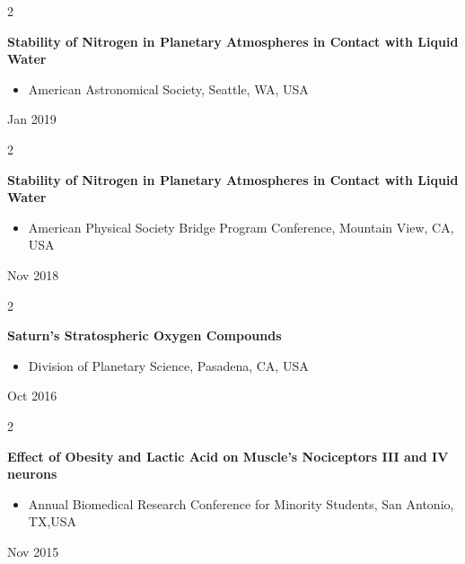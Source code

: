 \documentclass[10pt, letterpaper]{article}
\newenvironment{highlights}{
    \begin{itemize}[
        topsep=0.10 cm,
        parsep=0.10 cm,
        partopsep=0pt,
        itemsep=0pt,
        leftmargin=0.4 cm + 10pt
    ]
}{
    \end{itemize}
} %
\newenvironment{twocolentry}[2][]{
    \onecolentry
    \def\secondColumn{#2}
    \setcolumnwidth{\fill, 4.5 cm}
    \begin{paracol}{2}
}{
    \switchcolumn \raggedleft \secondColumn
    \end{paracol}
    \endonecolentry
} %
\begin{document}
        \begin{twocolentry}{
            Jan 2019
        }
            \textbf{Stability of Nitrogen in Planetary Atmospheres in Contact with Liquid Water}
            \begin{highlights}
                \item American Astronomical Society, Seattle, WA, USA
            \end{highlights}
        \end{twocolentry}


        \vspace{0.2 cm}

        \begin{twocolentry}{
            Nov 2018
        }
            \textbf{Stability of Nitrogen in Planetary Atmospheres in Contact with Liquid Water}
            \begin{highlights}
                \item American Physical Society Bridge Program Conference, Mountain View, CA, USA
            \end{highlights}
        \end{twocolentry}


        \vspace{0.2 cm}

        \begin{twocolentry}{
            Oct 2016
        }
            \textbf{Saturn's Stratospheric Oxygen Compounds}
            \begin{highlights}
                \item Division of Planetary Science, Pasadena, CA, USA
            \end{highlights}
        \end{twocolentry}


        \vspace{0.2 cm}

        \begin{twocolentry}{
            Nov 2015
        }
            \textbf{Effect of Obesity and Lactic Acid on Muscle's Nociceptors III and IV neurons}
            \begin{highlights}
                \item Annual Biomedical Research Conference for Minority Students, San Antonio, TX,USA
            \end{highlights}
        \end{twocolentry}


        \vspace{0.2 cm}
\end{document}
